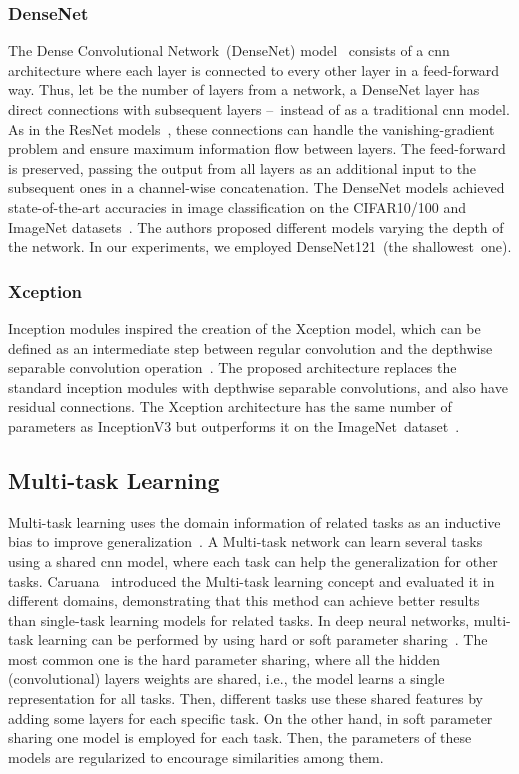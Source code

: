 \documentclass[journal]{IEEEtran}
\begin{document}
\subsubsection{\textbf{DenseNet}}

The Dense Convolutional Network~(DenseNet) model~\cite{huang2017densenet} consists of a \gls{cnn} architecture where each layer is connected to every other layer in a feed-forward way.
Thus, let  be the number of layers from a network, a DenseNet layer has  direct connections with subsequent layers --~instead of  as a traditional \gls{cnn} model.
As in the ResNet models~\cite{he2016resnet, he2016resnetv2}, these connections can handle the vanishing-gradient problem and ensure maximum information flow between layers.
The feed-forward is preserved, passing the output from all layers as an additional input to the subsequent ones in a channel-wise concatenation.
The DenseNet models achieved state-of-the-art accuracies in image classification on the CIFAR10/100 and ImageNet datasets~\cite{deng2009imagenet, huang2017densenet}. 
The authors proposed different models varying the depth of the network.
In our experiments, we employed DenseNet121~(the shallowest~one).

\subsubsection{\textbf{Xception}}

Inception modules inspired the creation of the Xception model, which can be defined as an intermediate step between regular convolution and the depthwise separable convolution operation~\cite{chollet2017xception}.
The proposed architecture replaces the standard inception modules with depthwise separable convolutions, and also have residual connections.
The Xception architecture has the same number of parameters as InceptionV3 but outperforms it on the ImageNet~dataset~\cite{deng2009imagenet}.


\subsection{Multi-task Learning}
\label{sec:multitask}

Multi-task learning uses the domain information of related tasks as an inductive bias to improve generalization~\cite{caruana1997multitask}.
A Multi-task network can learn several tasks using a shared \gls{cnn} model, where each task can help the generalization for other tasks.
Caruana~\cite{caruana1997multitask} introduced the Multi-task learning concept and evaluated it in different domains, demonstrating that this method can achieve better results than single-task learning models for related tasks.
In deep neural networks, multi-task learning can be performed by using hard or soft parameter sharing~\cite{ruder2017multideep}.
The most common one is the hard parameter sharing, where all the hidden (convolutional) layers weights are shared, i.e., the model learns a single representation for all tasks.
Then, different tasks use these shared features by adding some layers for each specific task.
On the other hand, in soft parameter sharing one model is employed for each task.
Then, the parameters of these models are regularized to encourage similarities among them.
\end{document}
